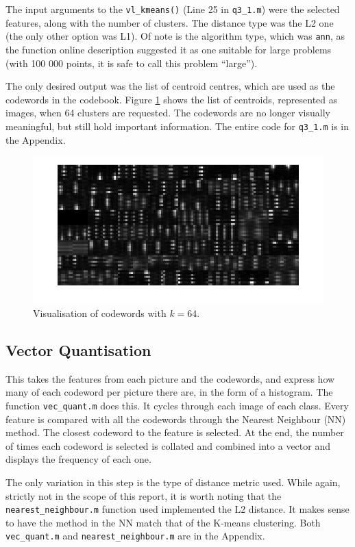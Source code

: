 \documentclass[a4paper, 10pt, conference]{ieeeconf}
\begin{document}
The input arguments to the \texttt{vl\_kmeans()} (Line 25 in \texttt{q3\_1.m}) were the selected features, along with the number of clusters. The distance type was the L2 one (the only other option was L1). Of note is the algorithm type, which was \texttt{ann}, as the function online description \cite{kmeans} suggested it as one suitable for large problems (with 100 000 points, it is safe to call this problem ``large'').

The only desired output was the list of centroid centres, which are used as the codewords in the codebook. Figure \ref{fig:visualcentroids} shows the list of centroids, represented as images, when 64 clusters are requested. The codewords are no longer visually meaningful, but still hold important information. The entire code for \texttt{q3\_1.m} is in the Appendix.

\begin{figure}[!ht]
    \centering
    \includegraphics[width=.5\linewidth]{img/codewords64.png}
    \caption{Visualisation of codewords with $k =64$.}
    \label{fig:visualcentroids}
\end{figure}

\subsection{Vector Quantisation}
This takes the features from each picture and the codewords, and express how many of each codeword per picture there are, in the form of a histogram. The function \texttt{vec\_quant.m} does this. It cycles through each image of each class. Every feature is compared with all the codewords through the Nearest Neighbour (NN) method. The closest codeword to the feature is selected. At the end, the number of times each codeword is selected is collated and combined into a vector and displays the frequency of each one.

The only variation in this step is the type of distance metric used. While again, strictly not in the scope of this report, it is worth noting that the \texttt{nearest\_neighbour.m} function used implemented the L2 distance. It makes sense to have the method in the NN match that of the K-means clustering. Both \texttt{vec\_quant.m} and \texttt{nearest\_neighbour.m} are in the Appendix.
\end{document}
